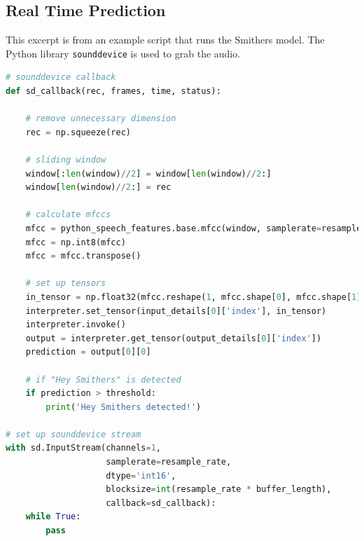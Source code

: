 \documentclass[conference]{IEEEtran}
\newcommand{\code}[1]{\texttt{#1}}
\begin{document}
\subsection{Real Time Prediction} \label{appendix:realtime}
This excerpt is from an example script that runs the Smithers model.
The Python library \code{sounddevice} is used to grab the audio.
\begin{lstlisting}[language=Python]
# sounddevice callback
def sd_callback(rec, frames, time, status):

    # remove unnecessary dimension
    rec = np.squeeze(rec)

    # sliding window
    window[:len(window)//2] = window[len(window)//2:]
    window[len(window)//2:] = rec

    # calculate mfccs
    mfcc = python_speech_features.base.mfcc(window, samplerate=resample_rate, winstep=0.025, numcep=13, winfunc=np.hanning)
    mfcc = np.int8(mfcc)
    mfcc = mfcc.transpose()

    # set up tensors
    in_tensor = np.float32(mfcc.reshape(1, mfcc.shape[0], mfcc.shape[1], 1))
    interpreter.set_tensor(input_details[0]['index'], in_tensor)
    interpreter.invoke()
    output = interpreter.get_tensor(output_details[0]['index'])
    prediction = output[0][0]

    # if "Hey Smithers" is detected
    if prediction > threshold:
        print('Hey Smithers detected!')

# set up sounddevice stream
with sd.InputStream(channels=1,
                    samplerate=resample_rate,
                    dtype='int16',
                    blocksize=int(resample_rate * buffer_length),
                    callback=sd_callback):
    while True:
        pass
\end{lstlisting}
\end{document}

